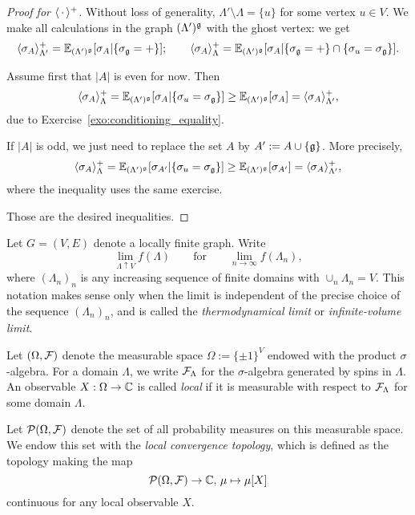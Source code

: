 \begin{proof}[Proof for $\langle\,\cdot\,\rangle^+$]
    Without loss of generality,
    $\Lambda'\setminus\Lambda=\{u\}$ for some
    vertex $u\in V$.
    We make all calculations in the graph $(\Lambda')^\mathfrak g$ with the ghost vertex:
    we get
    \[
        \langle\sigma_A\rangle_{\Lambda'}^+
        =
        \mathbb E_{(\Lambda')^\mathfrak g}[\sigma_A|\{\sigma_\mathfrak g=+\}];
        \qquad
        \langle\sigma_A\rangle_{\Lambda}^+
        =
        \mathbb E_{(\Lambda')^\mathfrak g}[\sigma_A|\{\sigma_\mathfrak g=+\}\cap\{\sigma_u=\sigma_\mathfrak g\}].
    \]

    Assume first that $|A|$ is even for now.
    Then
    \begin{equation}
        \langle\sigma_A\rangle_{\Lambda}^+
        =
        \mathbb E_{(\Lambda')^\mathfrak g}[\sigma_A|\{\sigma_u=\sigma_\mathfrak g\}]
        \geq
        \mathbb E_{(\Lambda')^\mathfrak g}[\sigma_A]
        =
        \langle\sigma_A\rangle_{\Lambda'}^+,
    \end{equation}
    due to Exercise~\ref{exo:conditioning_equality}.

    If $|A|$ is odd, we just need to replace the set $A$
    by $A':=A\cup\{\mathfrak g\}$.
    More precisely,
    \begin{equation}
        \langle\sigma_A\rangle_{\Lambda}^+
        =
        \mathbb E_{(\Lambda')^\mathfrak g}[\sigma_{A'}|\{\sigma_u=\sigma_\mathfrak g\}]
        \geq
        \mathbb E_{(\Lambda')^\mathfrak g}[\sigma_{A'}]
        =
        \langle\sigma_A\rangle_{\Lambda'}^+,
    \end{equation}
    where the inequality uses the same exercise.

    Those are the desired inequalities.
\end{proof}

\begin{definition}
    Let $G=(V,E)$ denote a locally finite graph.
    Write
    \[
        \lim_{\Lambda\uparrow V}f(\Lambda)
        \qquad\text{for}\qquad
        \lim_{n\to\infty}f(\Lambda_n),
    \]
where $(\Lambda_n)_n$ is any increasing sequence of finite domains 
with $\cup_n\Lambda_n=V$.
This notation makes sense only when the limit is independent
of the precise choice of the sequence $(\Lambda_n)_n$,
and is called the \emph{thermodynamical limit} or \emph{infinite-volume limit}.

Let $(\Omega,\mathcal F)$ denote the measurable space $\Omega:=\{\pm1\}^V$
endowed with the product $\sigma$-algebra.
For a domain $\Lambda$, we write $\mathcal F_\Lambda$
for the $\sigma$-algebra generated by spins in $\Lambda$.
An observable $X:\Omega\to\mathbb C$ is called \emph{local} if it is measurable
with respect to $\mathcal F_\Lambda$ for some domain $\Lambda$.

Let $\mathcal P(\Omega,\mathcal F)$ denote the set of all probability measures
on this measurable space.
We endow this set with the \emph{local convergence topology},
which is defined as the topology making the map
\[
    \mathcal P(\Omega,\mathcal F)\to\mathbb C,\,\mu\mapsto\mu[X]
\]
continuous for any local observable $X$.
\end{definition}

